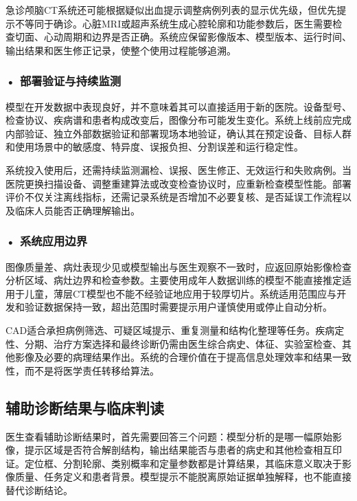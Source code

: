 急诊颅脑CT系统还可能根据疑似出血提示调整病例列表的显示优先级，但优先提示不等同于确诊。心脏MRI或超声系统生成心腔轮廓和功能参数后，医生需要检查切面、心动周期和边界是否正确。系统应保留影像版本、模型版本、运行时间、输出结果和医生修正记录，使整个使用过程能够追溯。

\subsubsection*{\textbf{• 部署验证与持续监测}}

模型在开发数据中表现良好，并不意味着其可以直接适用于新的医院。设备型号、检查协议、疾病谱和患者构成改变后，图像分布可能发生变化。系统上线前应完成内部验证、独立外部数据验证和部署现场本地验证，确认其在预定设备、目标人群和使用场景中的敏感度、特异度、误报负担、分割误差和运行稳定性。

系统投入使用后，还需持续监测漏检、误报、医生修正、无效运行和失败病例。当医院更换扫描设备、调整重建算法或改变检查协议时，应重新检查模型性能。部署评价不仅关注离线指标，还需记录系统是否增加不必要复核、是否延误工作流程以及临床人员能否正确理解输出。

\subsubsection*{\textbf{• 系统应用边界}}

图像质量差、病灶表现少见或模型输出与医生观察不一致时，应返回原始影像检查分析区域、病灶边界和检查参数。主要使用成年人数据训练的模型不能直接推定适用于儿童，薄层CT模型也不能不经验证地应用于较厚切片。系统适用范围应与开发和验证数据保持一致，超出范围时需要提示用户谨慎使用或停止自动分析。

CAD适合承担病例筛选、可疑区域提示、重复测量和结构化整理等任务。疾病定性、分期、治疗方案选择和最终诊断仍需由医生综合病史、体征、实验室检查、其他影像及必要的病理结果作出。系统的合理价值在于提高信息处理效率和结果一致性，而不是将医学责任转移给算法。

\subsection{辅助诊断结果与临床判读}

医生查看辅助诊断结果时，首先需要回答三个问题：模型分析的是哪一幅原始影像，提示区域是否符合解剖结构，输出结果能否与患者的病史和其他检查相互印证。定位框、分割轮廓、类别概率和定量参数都是计算结果，其临床意义取决于影像质量、任务定义和患者背景。模型提示不能脱离原始证据单独解释，也不能直接替代诊断结论。

